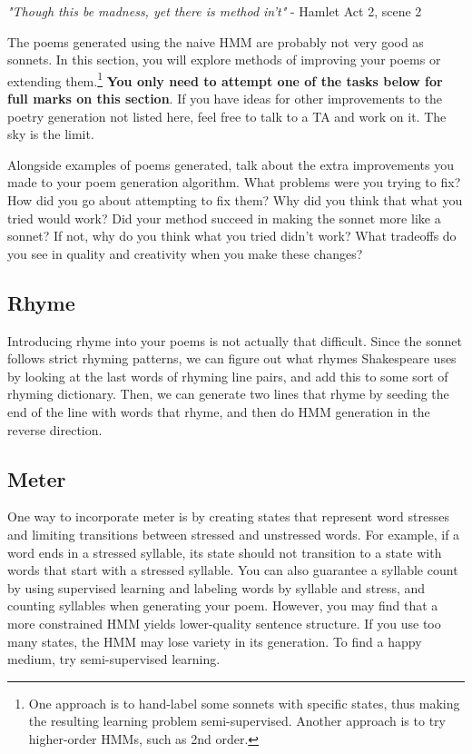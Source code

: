 \begin{center}
\emph{"Though this be madness, yet there is method in't"} - Hamlet Act 2, scene 2
\end{center}
\par
The poems generated using the naive HMM are probably not very good as sonnets. In this section, you will explore methods of improving your poems or extending them.\footnote{One approach is to hand-label some sonnets with specific states, thus making the resulting learning problem semi-supervised. Another approach is to try higher-order HMMs, such as 2nd order.} \textbf{You only need to attempt one of the tasks below for full marks on this section}. If you have ideas for other improvements to the poetry generation not listed here, feel free to talk to a TA and work on it. The sky is the limit.
\begin{report}
    Alongside examples of poems generated, talk about the extra improvements you made to your poem generation algorithm. What problems were you trying to fix? How did you go about attempting to fix them? Why did you think that what you tried would work? Did your method succeed in making the sonnet more like a sonnet? If not, why do you think what you tried didn't work? What tradeoffs do you see in quality and creativity when you make these changes? \newline
\end{report}

\subsection{Rhyme}
Introducing rhyme into your poems is not actually that difficult. Since the sonnet follows strict rhyming patterns, we can figure out what rhymes Shakespeare uses by looking at the last words of rhyming line pairs,  and add this to some sort of rhyming dictionary. Then, we can generate two lines that rhyme by seeding the end of the line with words that rhyme, and then do HMM generation in the reverse direction.

\subsection{Meter}
One way to incorporate meter is by creating states that represent word stresses and limiting transitions between stressed and unstressed words. For example, if a word ends in a stressed syllable, its state should not transition to a state with words that start with a stressed syllable. You can also guarantee a syllable count by using supervised learning and labeling words by syllable and stress, and counting syllables when generating your poem. However, you may find that a more constrained HMM yields lower-quality sentence structure. If you use too many states, the HMM may lose variety in its generation. To find a happy medium, try semi-supervised learning.

